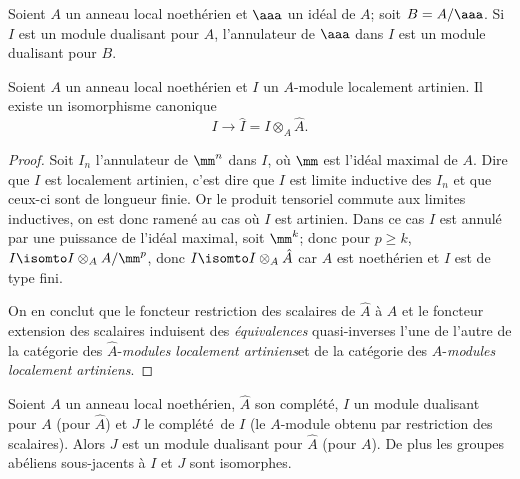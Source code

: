 \begin{corollaire} \label{IV.4.4} Soient $A$ un anneau local noeth\'erien et $\aaa$ un id\'eal de $A$; soit $B=A/\aaa$. Si $I$ est un module dualisant pour $A$, l'annulateur de $\aaa$ dans $I$ est un module dualisant pour $B$.
\end{corollaire}

\begin{lemme} \label{IV.4.5} Soient $A$ un anneau local noeth\'erien et $I$ un $A$-module localement artinien. Il existe un isomorphisme canonique
$$
I\to \hat{I}=I\otimes_{A}\hat{A}.
$$
\end{lemme}

\begin{proof}
Soit $I_{n}$ l'annulateur de $\mm^n$ dans $I$, o\`u $\mm$ est l'id\'eal maximal de $A$. Dire que $I$ est localement artinien, c'est dire que $I$ est limite inductive des $I_{n}$ et que ceux-ci sont de longueur finie. Or le produit tensoriel commute aux limites inductives, on est donc ramen\'e au cas o\`u $I$ est artinien. Dans ce cas $I$ est annul\'e par une puissance de l'id\'eal maximal, soit $\mm^{k}$; donc pour $p\geq k$, $I\isomto I\otimes_{A}A/\mm^{p}$, donc $I\isomto I\otimes_{A}\hat{A}$ car $A$ est noeth\'erien et $I$ est de type fini.

On en conclut que le foncteur restriction des scalaires de $\hat{A}$ \`a $A$ et le foncteur extension des scalaires induisent des \emph{\'equivalences} quasi-inverses l'une de l'autre de la cat\'egorie des $\hat{A}$-\emph{modules localement artiniens}\pageoriginale et de la cat\'egorie des $A$-\emph{modules localement artiniens}.
\skipqed
\end{proof}

\begin{proposition} \label{IV.4.6}
Soient $A$ un anneau local noeth\'erien, $\hat{A}$ son compl\'et\'e, $I$ un module dualisant pour $A$ (\resp pour $\hat{A}$) et $J$ le compl\'et\'e\, de $I$ (\resp le $A$-module obtenu par restriction des scalaires). Alors $J$ est un module dualisant pour $\hat{A}$ (\resp pour $A$). De plus les groupes ab\'eliens sous-jacents \`a $I$ et $J$ sont isomorphes.
\end{proposition}

